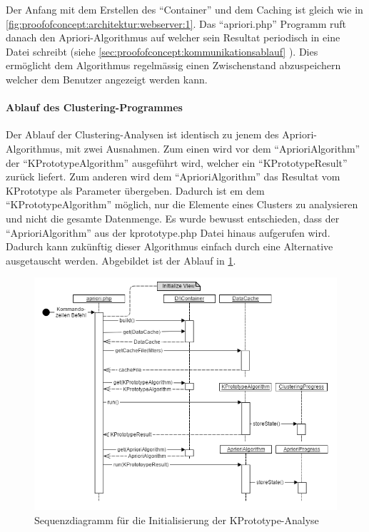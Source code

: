 Der Anfang mit dem Erstellen des "`Container"' und dem Caching ist gleich wie in \cref{fig:proofofconcept:architektur:webserver:1}. Das "`apriori.php"' Programm ruft danach den Apriori-Algorithmus auf welcher sein Resultat periodisch in eine Datei schreibt (siehe \cref{sec:proofofconcept:kommunikationsablauf} ). Dies ermöglicht dem Algorithmus regelmässig einen Zwischenstand abzuspeichern welcher dem Benutzer angezeigt werden kann.

\paragraph{Ablauf des Clustering-Programmes}
Der Ablauf der Clustering-Analysen ist identisch zu jenem des Apriori-Algorithmus, mit zwei Ausnahmen. Zum einen wird vor dem "`AprioriAlgorithm"' der "`KPrototypeAlgorithm"' ausgeführt wird, welcher ein "`KPrototypeResult"' zurück liefert. 
Zum anderen wird dem "`AprioriAlgorithm"' das Resultat vom KPrototype als Parameter übergeben. Dadurch ist em dem "`KPrototypeAlgorithm"' möglich, nur die Elemente eines Clusters zu analysieren und nicht die gesamte Datenmenge. 
Es wurde bewusst entschieden, dass der "`AprioriAlgorithm"' aus der kprototype.php Datei hinaus aufgerufen wird. Dadurch kann zukünftig dieser Algorithmus einfach durch eine Alternative ausgetauscht werden.
Abgebildet ist der Ablauf in \cref{fig:proofofconcept:architektur:hintergrundprozesser:2}. 
\begin{figure}[H]
	\centering
	\includegraphics[width=1\textwidth]{images/diagram-sequence-kprototype}
	\caption{Sequenzdiagramm für die Initialisierung der KPrototype-Analyse}
	\label{fig:proofofconcept:architektur:hintergrundprozesser:2}
\end{figure}

